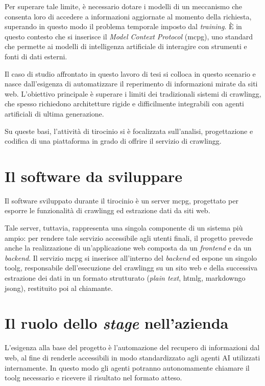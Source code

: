 Per superare tale limite, è necessario dotare i modelli di un meccanismo che 
consenta loro di accedere a informazioni aggiornate al momento della richiesta, 
superando in questo modo il problema temporale imposto dal \textit{training}.
È in questo contesto che si inserisce il \textit{Model Context Protocol} (\gls{mcpg})\glsfirstoccur, 
uno standard che permette ai modelli di intelligenza artificiale di interagire con 
strumenti e fonti di dati esterni. 

Il caso di studio affrontato in questo lavoro di tesi si colloca in 
questo scenario e nasce dall'esigenza di automatizzare il reperimento 
di informazioni mirate da siti web. L'obiettivo principale è superare i 
limiti dei tradizionali sistemi di 
\gls{crawlingg}\glsfirstoccur, che spesso richiedono architetture rigide e 
difficilmente integrabili con agenti artificiali di ultima generazione.

Su queste basi, l'attività di tirocinio si è focalizzata 
sull'analisi, progettazione e codifica di una piattaforma in grado di offrire
il servizio di \gls{crawlingg}.

\section{Il software da sviluppare}
Il software sviluppato durante il tirocinio è un server \gls{mcpg}, 
progettato per esporre le funzionalità 
di \gls{crawlingg} ed estrazione dati da siti web.

Tale server, tuttavia, rappresenta una singola componente di un sistema 
più ampio: per rendere tale servizio accessibile agli utenti finali, 
il progetto prevede anche la realizzazione di un'applicazione web 
composta da un \textit{frontend} e da un \textit{backend}. 
Il servizio \gls{mcpg} si inserisce all'interno del \textit{backend} ed 
espone un singolo \gls{toolg}\glsfirstoccur, responsabile dell'esecuzione del 
\gls{crawlingg} su un sito web e della successiva estrazione dei dati 
in un formato strutturato (\textit{plain text}, \gls{htmlg}\glsfirstoccur , 
\gls{markdowng}\glsfirstoccur o \gls{jsong}\glsfirstoccur), 
restituito poi al chiamante.
 
\section{Il ruolo dello \textit{stage} nell'azienda}
L'esigenza alla base del progetto è l'automazione del recupero di informazioni 
dal web, al fine di renderle accessibili in modo standardizzato agli agenti 
AI utilizzati internamente. In questo modo gli agenti potranno autonomamente chiamare 
il \gls{toolg} necessario e ricevere il risultato nel formato atteso.

